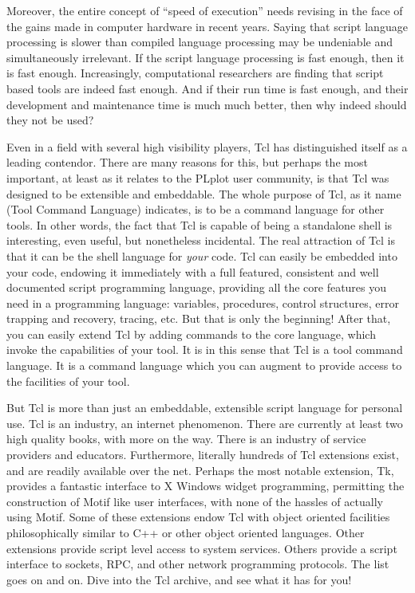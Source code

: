 Moreover, the entire concept of ``speed of execution'' needs revising
in the face of the gains made in computer hardware in recent years.
Saying that script language processing is slower than compiled
language processing may be undeniable and simultaneously irrelevant.
If the script language processing is fast enough, then it is fast
enough.  Increasingly, computational researchers are finding that
script based tools are indeed fast enough.  And if their run time is
fast enough, and their development and maintenance time is much much
better, then why indeed should they not be used?

Even in a field with several high visibility players, Tcl has
distinguished itself as a leading contendor.  There are many reasons
for this, but perhaps the most important, at least as it relates to
the PLplot user community, is that Tcl was designed to be extensible
and embeddable.  The whole purpose of Tcl, as it name (Tool Command
Language) indicates, is to be a command language for other tools.  In
other words, the fact that Tcl is capable of being a standalone shell
is interesting, even useful, but nonetheless incidental.  The real
attraction of Tcl is that it can be the shell language for \emph{your}
code.  Tcl can easily be embedded into your code, endowing it
immediately with a full featured, consistent and well documented
script programming language, providing all the core features you need
in a programming language: variables, procedures, control structures,
error trapping and recovery, tracing, etc.  But that is only the
beginning!  After that, you can easily extend Tcl by adding commands
to the core language, which invoke the capabilities of your tool.  It
is in this sense that Tcl is a tool command language.  It is a command
language which you can augment to provide access to the facilities of
your tool.

But Tcl is more than just an embeddable, extensible script language
for personal use.  Tcl is an industry, an internet phenomenon.  There
are currently at least two high quality books, with more on the way.
There is an industry of service providers and educators.  Furthermore,
literally hundreds of Tcl extensions exist, and are readily available
over the net.  Perhaps the most notable extension, Tk, provides a
fantastic interface to X Windows widget programming, permitting the
construction of Motif like user interfaces, with none of the hassles
of actually using Motif.  Some of these extensions endow Tcl with
object oriented facilities philosophically similar to C++ or other
object oriented languages.  Other extensions provide script level
access to system services.  Others provide a script interface to
sockets, RPC, and other network programming protocols.  The list goes
on and on.  Dive into the Tcl archive, and see what it has for you!

